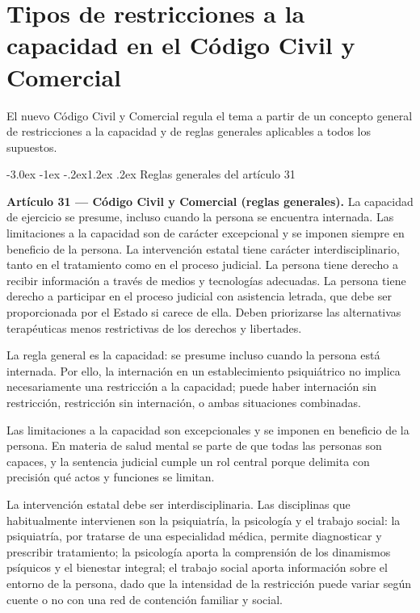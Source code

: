 \documentclass[12pt,oneside]{book}
\makeatletter
\renewcommand\section{\@startsection{section}{1}{\z@}%
  {-3.0ex \@plus -1ex \@minus -.2ex}{1.2ex \@plus .2ex}%
  {\normalfont\large\bfseries\color{acento}}}
\makeatother
\begin{document}

\chapter{Tipos de restricciones a la capacidad en el Código Civil y Comercial}
\label{ch:bloque2}

El nuevo Código Civil y Comercial regula el tema a partir de un concepto general de restricciones a la capacidad y de reglas generales aplicables a todos los supuestos.

\section{Reglas generales del artículo 31}

\begin{importante}
\textbf{Artículo 31 --- Código Civil y Comercial (reglas generales).} La capacidad de ejercicio se presume, incluso cuando la persona se encuentra internada. Las limitaciones a la capacidad son de carácter excepcional y se imponen siempre en beneficio de la persona. La intervención estatal tiene carácter interdisciplinario, tanto en el tratamiento como en el proceso judicial. La persona tiene derecho a recibir información a través de medios y tecnologías adecuadas. La persona tiene derecho a participar en el proceso judicial con asistencia letrada, que debe ser proporcionada por el Estado si carece de ella. Deben priorizarse las alternativas terapéuticas menos restrictivas de los derechos y libertades.
\end{importante}

La regla general es la capacidad: se presume incluso cuando la persona está internada. Por ello, la internación en un establecimiento psiquiátrico no implica necesariamente una restricción a la capacidad; puede haber internación sin restricción, restricción sin internación, o ambas situaciones combinadas.

Las limitaciones a la capacidad son excepcionales y se imponen en beneficio de la persona. En materia de salud mental se parte de que todas las personas son capaces, y la sentencia judicial cumple un rol central porque delimita con precisión qué actos y funciones se limitan.

La intervención estatal debe ser interdisciplinaria. Las disciplinas que habitualmente intervienen son la psiquiatría, la psicología y el trabajo social: la psiquiatría, por tratarse de una especialidad médica, permite diagnosticar y prescribir tratamiento; la psicología aporta la comprensión de los dinamismos psíquicos y el bienestar integral; el trabajo social aporta información sobre el entorno de la persona, dado que la intensidad de la restricción puede variar según cuente o no con una red de contención familiar y social.
\end{document}
